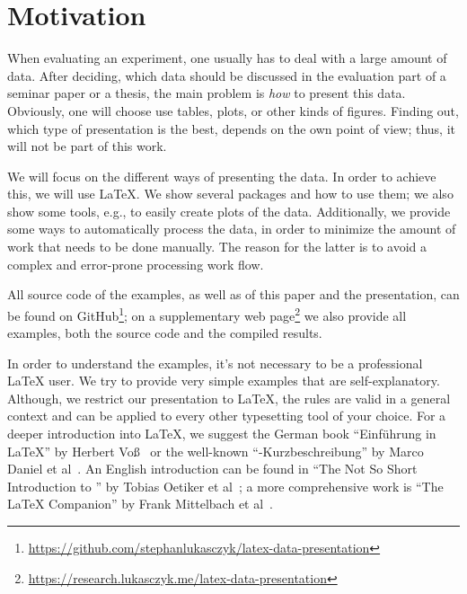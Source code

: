 \section{Motivation}

When evaluating an experiment, one usually has to deal with a large amount of
data.  After deciding, which data should be discussed in the evaluation part of
a seminar paper or a thesis, the main problem is \emph{how} to present this
data. Obviously, one will choose use tables, plots, or other kinds of figures.
Finding out, which type of presentation is the best, depends on the own point of
view; thus, it will not be part of this work.

We will focus on the different ways of presenting the data.  In order to achieve
this, we will use \LaTeX\@.  We show several packages and how to use them; we
also show some tools, e.g., to easily create plots of the data.  Additionally,
we provide some ways to automatically process the data, in order to minimize the
amount of work that needs to be done manually.  The reason for the latter is to
avoid a complex and error-prone processing work flow.

All source code of the examples, as well as of this paper and the presentation,
can be found on GitHub\footnote{%
  \href{https://github.com/stephanlukasczyk/latex-data-presentation}%
    {https://github.com/stephanlukasczyk/latex-data-presentation}}; on a
supplementary web page\footnote{%
  \href{https://research.lukasczyk.me/latex-data-presentation}%
    {https://research.lukasczyk.me/latex-data-presentation}} we also provide all
examples, both the source code and the compiled results.

In order to understand the examples, it's not necessary to be a professional
\LaTeX{} user.  We try to provide very simple examples that are
self-explanatory.  Although, we restrict our presentation to \LaTeX{}, the rules
are valid in a general context and can be applied to every other typesetting
tool of your choice.  For a deeper introduction into \LaTeX{}, we suggest the
German book \enquote{Einführung in \LaTeX} by Herbert Voß~\cite{Voss2012} or the
well-known \enquote{-Kurzbeschreibung} by Marco Daniel et
al~\cite{Daniel2015}.  An English introduction can be found in \enquote{The Not
So Short Introduction to } by Tobias Oetiker et
al~\cite{Oetiker2015}; a more comprehensive work is \enquote{The \LaTeX{}
Companion} by Frank Mittelbach et al~\cite{Mittelbach2008}.
